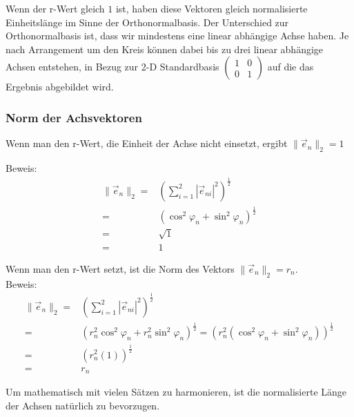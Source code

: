\documentclass[a4paper]{article}
\begin{document}
Wenn der r-Wert gleich $1$ ist, haben diese Vektoren gleich normalisierte Einheitsl\"ange im Sinne der Orthonormalbasis. Der Unterschied zur Orthonormalbasis ist, dass wir mindestens eine linear abh\"angige Achse haben. Je nach Arrangement um den Kreis k\"onnen dabei bis zu drei linear abh\"angige Achsen entstehen, in Bezug zur 2-D Standardbasis $\begin{pmatrix}1&0\\0&1\end{pmatrix}$ auf die das Ergebnis abgebildet wird.\\

\subsubsection{Norm der Achsvektoren}
\label{Norm_Achsvektoren}

Wenn man den r-Wert, die Einheit der Achse nicht einsetzt, ergibt $\|\vec{e}_n\|_2 = 1$

Beweis:\\
\begin{displaymath}
\begin{align}
    \|\vec{e}_n\|_2 =& (\sum_{i=1}^{2}|\vec{e}_{ni}|^2)^{\frac12} \\
    =&  (\cos^{2}\varphi_n + \sin^{2}\varphi_n)^{\frac12}\\
    =& \sqrt{1}\\
    =& 1
\end{align}
\end{displaymath}

Wenn man den r-Wert setzt, ist die Norm des Vektors $\|\vec{e}_n\|_2 = r_n$.\\

Beweis:\\
\begin{displaymath}
\begin{align}
    \|\vec{e}_n\|_2 =& (\sum_{i=1}^{2}|\vec{e}_{ni}|^2)^{\frac12} \\
    =& (r_{n}^{2}\cos^{2}\varphi_n + r_{n}^{2}\sin^{2}\varphi_n)^{\frac12} = (r_{n}^2(\cos^{2}\varphi_n + \sin^{2}\varphi_n))^{\frac12}\\
    =& (r_{n}^2(1))^{\frac12} \\
    =& r_n
\end{align}
\end{displaymath}

Um mathematisch mit vielen S\"atzen zu harmonieren, ist die normalisierte L\"ange der Achsen nat\"urlich zu bevorzugen.\\
\end{document}
